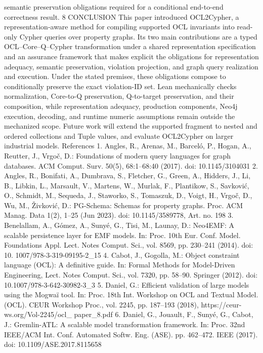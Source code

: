 semantic preservation obligations required for a conditional end-to-end correctness
result.
8 CONCLUSION
This paper introduced OCL2Cypher, a representation-aware method for compiling supported OCL invariants into read-only Cypher queries over property graphs. Its two
main contributions are a typed OCL–Core–Q–Cypher transformation under a shared
representation specification and an assurance framework that makes explicit the obligations for representation adequacy, semantic preservation, violation projection, and graph
query realization and execution. Under the stated premises, these obligations compose
to conditionally preserve the exact violation-ID set. Lean mechanically checks normalization, Core-to-Q preservation, Q-to-target preservation, and their composition, while
representation adequacy, production components, Neo4j execution, decoding, and runtime numeric assumptions remain outside the mechanized scope. Future work will extend the supported fragment to nested and ordered collections and Tuple values, and
evaluate OCL2Cypher on larger industrial models.
References
1. Angles, R., Arenas, M., Barceló, P., Hogan, A., Reutter, J., Vrgoč, D.: Foundations of modern query languages for graph
databases. ACM Comput. Surv. 50(5), 68:1–68:40 (2017). doi: 10.1145/3104031
2. Angles, R., Bonifati, A., Dumbrava, S., Fletcher, G., Green, A., Hidders, J., Li, B., Libkin, L., Marsault, V., Martens,
W., Murlak, F., Plantikow, S., Savković, O., Schmidt, M., Sequeda, J., Staworko, S., Tomaszuk, D., Voigt, H., Vrgoč,
D., Wu, M., Živković, D.: PG-Schema: Schemas for property graphs. Proc. ACM Manag. Data 1(2), 1–25 (Jun 2023).
doi: 10.1145/3589778, Art. no. 198
3. Benelallam, A., Gómez, A., Sunyé, G., Tisi, M., Launay, D.: Neo4EMF: A scalable persistence layer for EMF models.
In: Proc. 10th Eur. Conf. Model. Foundations Appl. Lect. Notes Comput. Sci., vol. 8569, pp. 230–241 (2014). doi: 10.
1007/978-3-319-09195-2_15
4. Cabot, J., Gogolla, M.: Object constraint language (OCL): A definitive guide. In: Formal Methods for Model-Driven
Engineering, Lect. Notes Comput. Sci., vol. 7320, pp. 58–90. Springer (2012). doi: 10.1007/978-3-642-30982-3_3
5. Daniel, G.: Efficient validation of large models using the Mogwaï tool. In: Proc. 18th Int. Workshop on OCL and Textual
Model. (OCL). CEUR Workshop Proc., vol. 2245, pp. 187–193 (2018), https://ceur-ws.org/Vol-2245/ocl_
paper_8.pdf
6. Daniel, G., Jouault, F., Sunyé, G., Cabot, J.: Gremlin-ATL: A scalable model transformation framework. In: Proc. 32nd
IEEE/ACM Int. Conf. Automated Softw. Eng. (ASE). pp. 462–472. IEEE (2017). doi: 10.1109/ASE.2017.8115658
